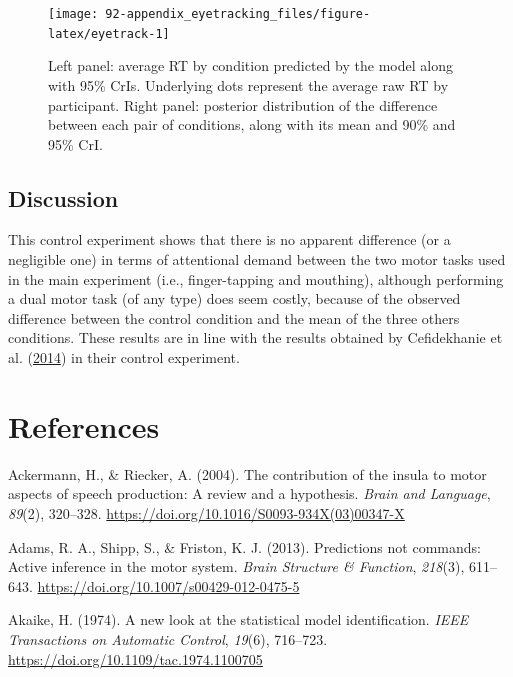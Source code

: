 \documentclass[a4paper,12pt,twoside,onecolumn,openright,final,oldfontcommands]{memoir}
\begin{document}
\begin{figure}[H]
\texttt{[image: 92-appendix\_eyetracking\_files/figure-latex/eyetrack-1]} \caption{Left panel: average RT by condition predicted by the model along with 95\% CrIs. Underlying dots represent the average raw RT by participant. Right panel: posterior distribution of the difference between each pair of conditions, along with its mean and 90\% and 95\% CrI.}\label{fig:eyetrack}
\end{figure}

\hypertarget{discussion-5}{%
\section{Discussion}\label{discussion-5}}

This control experiment shows that there is no apparent difference (or a negligible one) in terms of attentional demand between the two motor tasks used in the main experiment (i.e., finger-tapping and mouthing), although performing a dual motor task (of any type) does seem costly, because of the observed difference between the control condition and the mean of the three others conditions. These results are in line with the results obtained by Cefidekhanie et al. (\protect\hyperlink{ref-cefidekhanie_interaction_2014}{2014}) in their control experiment.

\hypertarget{references}{%
\chapter*{References}\label{references}}


\setlength{\parindent}{-0.5in}
\setlength{\leftskip}{0.5in}
\setlength{\parskip}{8pt}

\hypertarget{refs}{}
\leavevmode\hypertarget{ref-ackermann_contribution_2004}{}%
Ackermann, H., \& Riecker, A. (2004). The contribution of the insula to motor aspects of speech production: A review and a hypothesis. \emph{Brain and Language}, \emph{89}(2), 320--328. \url{https://doi.org/10.1016/S0093-934X(03)00347-X}

\leavevmode\hypertarget{ref-adams_predictions_2013}{}%
Adams, R. A., Shipp, S., \& Friston, K. J. (2013). Predictions not commands: Active inference in the motor system. \emph{Brain Structure \& Function}, \emph{218}(3), 611--643. \url{https://doi.org/10.1007/s00429-012-0475-5}

\leavevmode\hypertarget{ref-akaike_new_1974}{}%
Akaike, H. (1974). A new look at the statistical model identification. \emph{IEEE Transactions on Automatic Control}, \emph{19}(6), 716--723. \url{https://doi.org/10.1109/tac.1974.1100705}
\end{document}

